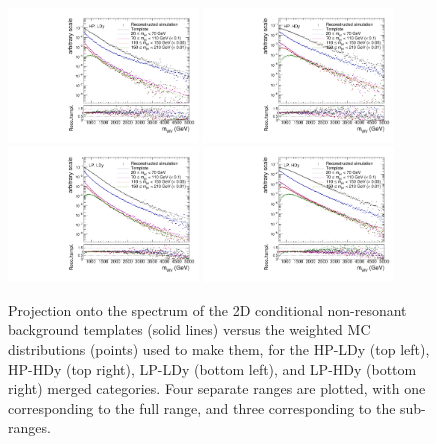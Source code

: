 \begin{figure}[htbp]
  \centering
  \includegraphics[width=0.45\textwidth]{fig/2Dfit/templateVsReco_nonResCond_MVV_e_HP_nobb_LDy.pdf}
  \includegraphics[width=0.45\textwidth]{fig/2Dfit/templateVsReco_nonResCond_MVV_e_HP_nobb_HDy.pdf}\\
  \includegraphics[width=0.45\textwidth]{fig/2Dfit/templateVsReco_nonResCond_MVV_e_LP_nobb_LDy.pdf}
  \includegraphics[width=0.45\textwidth]{fig/2Dfit/templateVsReco_nonResCond_MVV_e_LP_nobb_HDy.pdf}\\
  \caption{
    Projection onto the \MVV spectrum of the 2D conditional non-resonant background templates (solid lines) versus the weighted MC distributions (points) used to make them, for the HP-LDy (top left), HP-HDy (top right), LP-LDy (bottom left), and LP-HDy (bottom right) merged categories.
    Four separate \MJ ranges are plotted, with one corresponding to the full \MJ range, and three corresponding to the sub-ranges.
  }
  \label{fig:condTemplateVscondReco_nonRes_MVV_Run2}
\end{figure}

